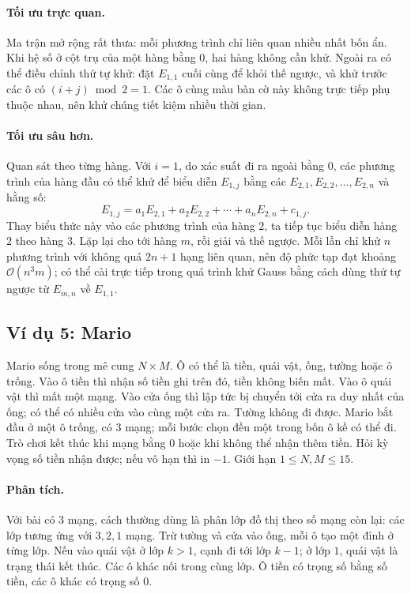 \documentclass[11pt]{article}
\newcommand{\Oh}{\mathcal{O}}
\begin{document}
\paragraph{Tối ưu trực quan.}
Ma trận mở rộng rất thưa: mỗi phương trình chỉ liên quan nhiều nhất bốn ẩn.
Khi hệ số ở cột trụ của một hàng bằng \(0\), hai hàng không cần khử. Ngoài ra
có thể điều chỉnh thứ tự khử: đặt \(E_{1,1}\) cuối cùng để khỏi thế ngược, và
khử trước các ô có \((i+j)\bmod2=1\). Các ô cùng màu bàn cờ này không trực tiếp
phụ thuộc nhau, nên khử chúng tiết kiệm nhiều thời gian.

\paragraph{Tối ưu sâu hơn.}
Quan sát theo từng hàng. Với \(i=1\), do xác suất đi ra ngoài bằng \(0\), các
phương trình của hàng đầu có thể khử để biểu diễn \(E_{1,j}\) bằng các
\(E_{2,1},E_{2,2},\ldots,E_{2,n}\) và hằng số:
\[
  E_{1,j}=a_1E_{2,1}+a_2E_{2,2}+\cdots+a_nE_{2,n}+c_{1,j}.
\]
Thay biểu thức này vào các phương trình của hàng \(2\), ta tiếp tục biểu diễn
hàng \(2\) theo hàng \(3\). Lặp lại cho tới hàng \(m\), rồi giải và thế ngược.
Mỗi lần chỉ khử \(n\) phương trình với không quá \(2n+1\) hạng liên quan, nên
độ phức tạp đạt khoảng \(\Oh(n^3m)\); có thể cài trực tiếp trong quá trình khử
Gauss bằng cách dùng thứ tự ngược từ \(E_{m,n}\) về \(E_{1,1}\).

\subsection{Ví dụ 5: Mario}

Mario sống trong mê cung \(N\times M\). Ô có thể là tiền, quái vật, ống, tường
hoặc ô trống. Vào ô tiền thì nhận số tiền ghi trên đó, tiền không biến mất.
Vào ô quái vật thì mất một mạng. Vào cửa ống thì lập tức bị chuyển tới cửa ra
duy nhất của ống; có thể có nhiều cửa vào cùng một cửa ra. Tường không đi
được. Mario bắt đầu ở một ô trống, có \(3\) mạng; mỗi bước chọn đều một trong
bốn ô kề có thể đi. Trò chơi kết thúc khi mạng bằng \(0\) hoặc khi không thể
nhận thêm tiền. Hỏi kỳ vọng số tiền nhận được; nếu vô hạn thì in \(-1\).
Giới hạn \(1\le N,M\le15\).

\paragraph{Phân tích.}
Với bài có \(3\) mạng, cách thường dùng là phân lớp đồ thị theo số mạng còn
lại: các lớp tương ứng với \(3,2,1\) mạng. Trừ tường và cửa vào ống, mỗi ô
tạo một đỉnh ở từng lớp. Nếu vào quái vật ở lớp \(k>1\), cạnh đi tới lớp
\(k-1\); ở lớp \(1\), quái vật là trạng thái kết thúc. Các ô khác nối trong
cùng lớp. Ô tiền có trọng số bằng số tiền, các ô khác có trọng số \(0\).
\end{document}
